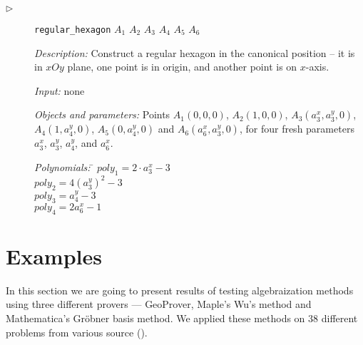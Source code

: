 \documentclass[final,1p,times,authoryear]{elsarticle}
\begin{document}
\begin{description}
\item[$\triangleright$] {\tt regular\_hexagon} $A_1$ $A_2$ $A_3$ $A_4$ $A_5$ $A_6$

  {\em Description:} Construct a regular hexagon in the canonical
  position -- it is in $xOy$ plane, one point is in origin, and
  another point is on $x$-axis. 
  
  {\em Input:} none

  {\em Objects and parameters:} Points $A_1(0, 0, 0)$, $A_2(1, 0, 0)$,
  $A_3(a_3^x, a_3^y, 0)$, $A_4(1, a_4^y, 0)$, $A_5(0, a_4^y, 0)$ and
  $A_6(a_6^x, a_3^y, 0)$, for four fresh parameters $a_3^x$, $a_3^y$,
  $a_4^y$, and $a_6^x$.

\begin{tabbing}
{\em Polynomials:} \= $poly_1 = 2\cdot a_3^x - 3$ \\
                   \> $poly_2 = 4(a_3^y)^2 - 3$ \\
                   \> $poly_3 = a_4^y - 3$ \\
                   \> $poly_4 = 2a_6^x - 1$
\end{tabbing}

\end{description}

\section{Examples}

In this section we are going to present results of testing
algebraization methods using three different provers --- GeoProver,
Maple's Wu's method and Mathematica's Gr\"obner basis method. We
applied these methods on 38 different problems from various source
(\cite{janicic1997zbirka, shao2016challenging, arhzbirka, kinknjiga}).
\end{document}
